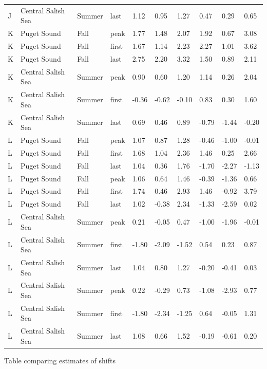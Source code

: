 \documentclass{article}
\begin{document}
\begin{table}[ht]
\begin{tabular}{|p{}|p{}|p{}|p{}|p{}|p{}|p{}|p{}|p{}|p{}|}
  J & Central Salish Sea & Summer & last & 1.12 & 0.95 & 1.27 & 0.47 & 0.29 & 0.65 \\ 
  K & Puget Sound & Fall & peak & 1.77 & 1.48 & 2.07 & 1.92 & 0.67 & 3.08 \\ 
  K & Puget Sound & Fall & first & 1.67 & 1.14 & 2.23 & 2.27 & 1.01 & 3.62 \\ 
  K & Puget Sound & Fall & last & 2.75 & 2.20 & 3.32 & 1.50 & 0.89 & 2.11 \\ 
  K & Central Salish Sea & Summer & peak & 0.90 & 0.60 & 1.20 & 1.14 & 0.26 & 2.04 \\ 
  K & Central Salish Sea & Summer & first & -0.36 & -0.62 & -0.10 & 0.83 & 0.30 & 1.60 \\ 
  K & Central Salish Sea & Summer & last & 0.69 & 0.46 & 0.89 & -0.79 & -1.44 & -0.20 \\ 
   \hline
L & Puget Sound & Fall & peak & 1.07 & 0.87 & 1.28 & -0.46 & -1.00 & -0.01 \\ 
  L & Puget Sound & Fall & first & 1.68 & 1.04 & 2.36 & 1.46 & 0.25 & 2.66 \\ 
  L & Puget Sound & Fall & last & 1.04 & 0.36 & 1.76 & -1.70 & -2.27 & -1.13 \\ 
   \hline
L & Puget Sound & Fall & peak & 1.06 & 0.64 & 1.46 & -0.39 & -1.36 & 0.66 \\ 
  L & Puget Sound & Fall & first & 1.74 & 0.46 & 2.93 & 1.46 & -0.92 & 3.79 \\ 
  L & Puget Sound & Fall & last & 1.02 & -0.38 & 2.34 & -1.33 & -2.59 & 0.02 \\ 
   \hline
L & Central Salish Sea & Summer & peak & 0.21 & -0.05 & 0.47 & -1.00 & -1.96 & -0.01 \\ 
  L & Central Salish Sea & Summer & first & -1.80 & -2.09 & -1.52 & 0.54 & 0.23 & 0.87 \\ 
  L & Central Salish Sea & Summer & last & 1.04 & 0.80 & 1.27 & -0.20 & -0.41 & 0.03 \\ 
   \hline
L & Central Salish Sea & Summer & peak & 0.22 & -0.29 & 0.73 & -1.08 & -2.93 & 0.77 \\ 
  L & Central Salish Sea & Summer & first & -1.80 & -2.34 & -1.25 & 0.64 & -0.05 & 1.31 \\ 
  L & Central Salish Sea & Summer & last & 1.08 & 0.66 & 1.52 & -0.19 & -0.61 & 0.20 \\ 
   \hline
\end{tabular}
\endgroup
\end{table}
\par Table comparing estimates of shifts
\end{document}
